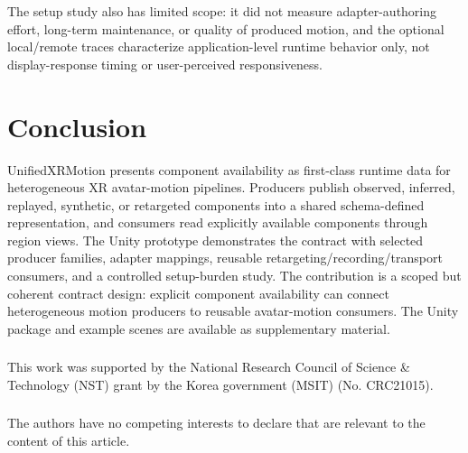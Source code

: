 \documentclass[runningheads]{llncs}
\begin{document}
The setup study also has limited scope: it did not measure adapter-authoring effort, long-term maintenance, or quality of produced motion, and the optional local/remote traces characterize application-level runtime behavior only, not display-response timing or user-perceived responsiveness.



\section{Conclusion}\label{sec:conclusion}
UnifiedXRMotion presents component availability as first-class runtime data for heterogeneous XR avatar-motion pipelines. Producers publish observed, inferred, replayed, synthetic, or retargeted components into a shared schema-defined representation, and consumers read explicitly available components through region views. The Unity prototype demonstrates the contract with selected producer families, adapter mappings, reusable retargeting/recording/transport consumers, and a controlled setup-burden study. The contribution is a scoped but coherent contract design: explicit component availability can connect heterogeneous motion producers to reusable avatar-motion consumers.
The Unity package and example scenes are available as supplementary material.

\begin{credits}
\subsubsection{\ackname}
This work was supported by the National Research Council of Science \& Technology (NST) grant by the Korea government (MSIT) (No. CRC21015).

\subsubsection{\discintname}
The authors have no competing interests to declare that are relevant to the content of this article.
\end{credits}



\end{document}

